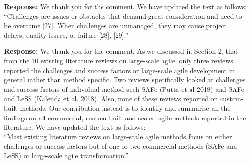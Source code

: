 \documentclass[a4paper,twoside,11pt]{reviewresponse}
\begin{document}

\textbf{Response:}
We thank you for the comment. We have updated the text as follows: \\
``Challenges are issues or obstacles that demand great consideration and need to be overcome [27]. When challenges are unmanaged, they may cause project delays, quality issues, or failure [28], [29].''

\textbf{Response:}
We thank you for the comment. As we discussed in Section 2, that from the 10 existing literature reviews on large-scale agile, only three reviews reported the challenges and success factors or large-scale agile development in general rather than method specific. Two reviews specifically looked at challenges and success factors of individual method such SAFe (Putta et al 2018) and SAFe and LeSS (Kalenda et al. 2018). Also, none of these reviews reported on custom-built methods. Our contribution instead is to identify and summarise all the findings on all commercial, custom-built and scaled agile methods reported in the literature. We have updated the text as follows: \\
``Most existing literature reviews on large-scale agile methods focus on either challenges or success factors but of one or two commercial methods (SAFe and LeSS) or large-scale agile transformation.''
\end{document}
